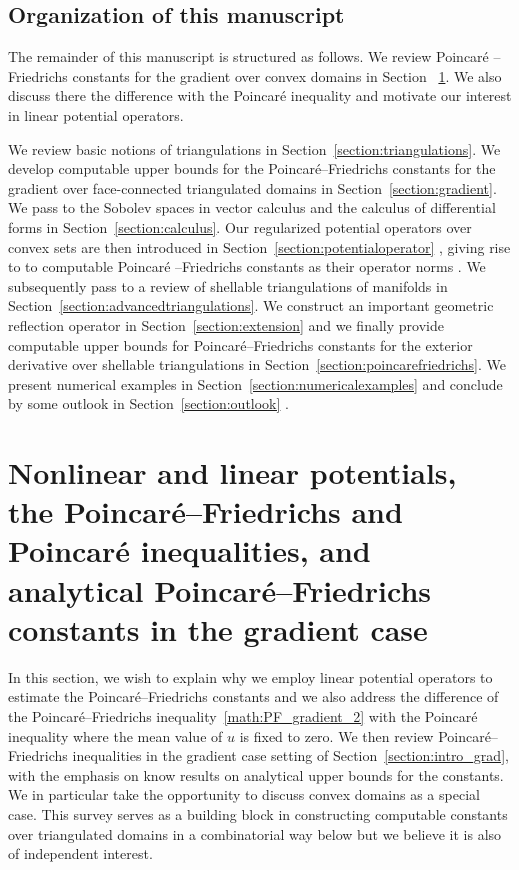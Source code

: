 \documentclass[10pt,letterpaper]{article}
\newcommand\cye[1]{%
  \protect\leavevmode
  \begingroup
    \color{red!35!yellow}%
    #1%
  \endgroup
}
\begin{document}
\subsection{\cye{Organization of this manuscript}}

The remainder of this manuscript is structured as follows.
We review Poincar\'e\cye{--Friedrichs} constants for the gradient over convex domains in \cye{Section}~\ref{section:poincare}. \cye{We also discuss there the difference with the Poincar\'e inequality and motivate our interest in linear potential operators.}
We review basic notions of triangulations in Section~\ref{section:triangulations}.
We develop computable upper bounds for \cye{the} Poincar\'e--Friedrichs constants for the gradient over \cye{face-connected} triangulated domains in Section~\ref{section:gradient}.
We \cye{pass to} the Sobolev spaces in vector calculus and the calculus of differential forms in Section~\ref{section:calculus}. \cye{Our} regularized potential operators over convex sets are \cye{then introduced} in Section~\ref{section:potentialoperator}\cye{, giving rise to to computable Poincar\'e\cye{--Friedrichs} constants as their operator norms}. We \cye{subsequently pass to a} review of shellable triangulations of manifolds in Section~\ref{section:advancedtriangulations}.
We construct an important geometric reflection operator in Section~\ref{section:extension}
and we finally provide computable upper bounds for Poincar\'e--Friedrichs constants for the exterior derivative over shellable triangulations in Section~\ref{section:poincarefriedrichs}.
We present numerical examples in Section~\ref{section:numericalexamples} \cye{and conclude by some outlook in Section~\ref{section:outlook}}. 














\section{\cye{Nonlinear and linear potentials, the Poincar\'e--Friedrichs and Poincar\'e inequalities, and \cye{analytical} Poincar\'e--Friedrichs constants in the gradient case}} \label{section:poincare} 


\cye{In this section, we wish to explain why we employ linear potential operators to estimate the Poincar\'e--Friedrichs constants and we also address the difference of the Poincar\'e--Friedrichs inequality~\eqref{math:PF_gradient_2} with the Poincar\'e inequality where the mean value of $u$ is fixed to zero.} \cye{We then review Poincar\'e--Friedrichs inequalities in the gradient case setting of Section~\ref{section:intro_grad}, with the emphasis on know results on analytical upper bounds for the constants.} We \cye{in particular} take the opportunity to discuss convex domains as a special case. This survey serves as a building block in constructing computable constants over triangulated domains \cye{in a combinatorial way below} but we believe it \cye{is also} of independent interest.
\end{document}
